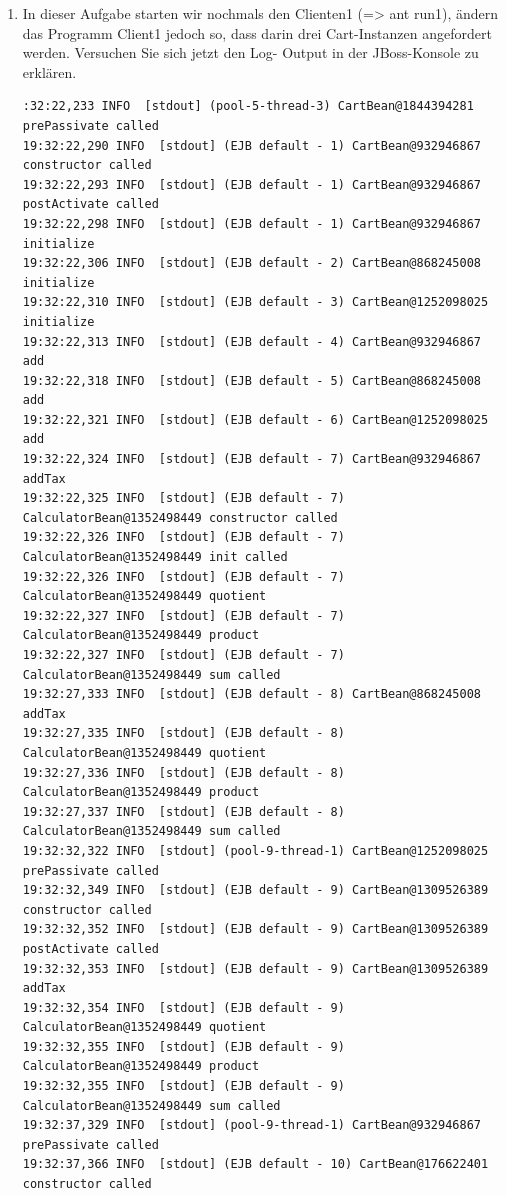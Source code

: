 \documentclass[a4paper,10pt]{scrreprt}
\begin{document}
\begin{enumerate}
\begin{lstlisting}[language={}]
\end{lstlisting}
\item In dieser Aufgabe starten wir nochmals den Clienten1 (=> ant run1), ändern das Programm Client1
jedoch so, dass darin drei Cart-Instanzen angefordert werden. Versuchen Sie sich jetzt den Log-
Output in der JBoss-Konsole zu erklären.
\begin{lstlisting}[language={}]
 :32:22,233 INFO  [stdout] (pool-5-thread-3) CartBean@1844394281 prePassivate called
19:32:22,290 INFO  [stdout] (EJB default - 1) CartBean@932946867 constructor called
19:32:22,293 INFO  [stdout] (EJB default - 1) CartBean@932946867 postActivate called
19:32:22,298 INFO  [stdout] (EJB default - 1) CartBean@932946867 initialize
19:32:22,306 INFO  [stdout] (EJB default - 2) CartBean@868245008 initialize
19:32:22,310 INFO  [stdout] (EJB default - 3) CartBean@1252098025 initialize
19:32:22,313 INFO  [stdout] (EJB default - 4) CartBean@932946867 add
19:32:22,318 INFO  [stdout] (EJB default - 5) CartBean@868245008 add
19:32:22,321 INFO  [stdout] (EJB default - 6) CartBean@1252098025 add
19:32:22,324 INFO  [stdout] (EJB default - 7) CartBean@932946867 addTax
19:32:22,325 INFO  [stdout] (EJB default - 7) CalculatorBean@1352498449 constructor called
19:32:22,326 INFO  [stdout] (EJB default - 7) CalculatorBean@1352498449 init called
19:32:22,326 INFO  [stdout] (EJB default - 7) CalculatorBean@1352498449 quotient
19:32:22,327 INFO  [stdout] (EJB default - 7) CalculatorBean@1352498449 product
19:32:22,327 INFO  [stdout] (EJB default - 7) CalculatorBean@1352498449 sum called
19:32:27,333 INFO  [stdout] (EJB default - 8) CartBean@868245008 addTax
19:32:27,335 INFO  [stdout] (EJB default - 8) CalculatorBean@1352498449 quotient
19:32:27,336 INFO  [stdout] (EJB default - 8) CalculatorBean@1352498449 product
19:32:27,337 INFO  [stdout] (EJB default - 8) CalculatorBean@1352498449 sum called
19:32:32,322 INFO  [stdout] (pool-9-thread-1) CartBean@1252098025 prePassivate called
19:32:32,349 INFO  [stdout] (EJB default - 9) CartBean@1309526389 constructor called
19:32:32,352 INFO  [stdout] (EJB default - 9) CartBean@1309526389 postActivate called
19:32:32,353 INFO  [stdout] (EJB default - 9) CartBean@1309526389 addTax
19:32:32,354 INFO  [stdout] (EJB default - 9) CalculatorBean@1352498449 quotient
19:32:32,355 INFO  [stdout] (EJB default - 9) CalculatorBean@1352498449 product
19:32:32,355 INFO  [stdout] (EJB default - 9) CalculatorBean@1352498449 sum called
19:32:37,329 INFO  [stdout] (pool-9-thread-1) CartBean@932946867 prePassivate called
19:32:37,366 INFO  [stdout] (EJB default - 10) CartBean@176622401 constructor called

\end{lstlisting}
\end{enumerate}
\end{document}
